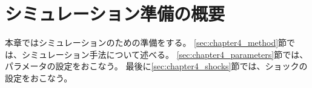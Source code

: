 
\section{シミュレーション準備の概要}
\label{sec:chapter4_overview}
本章ではシミュレーションのための準備をする。
\ref{sec:chapter4_method}節では、シミュレーション手法について述べる。
\ref{sec:chapter4_parameters}節では、パラメータの設定をおこなう。
最後に\ref{sec:chapter4_shocks}節では、ショックの設定をおこなう。